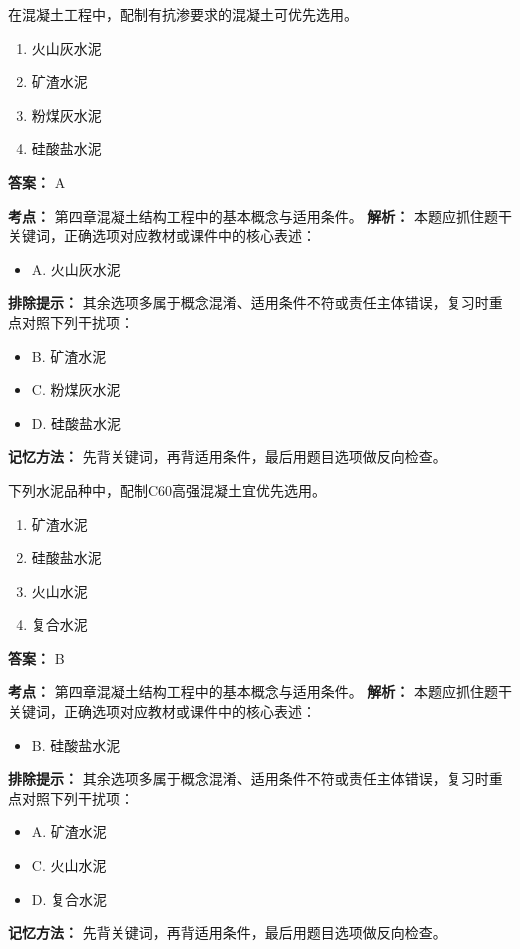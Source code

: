 \documentclass[UTF8,fontset=fandol,11pt]{ctexart}
\begin{document}
\vspace{0.2em}

\begin{quizbox}[title={第 50 题}]
在混凝土工程中，配制有抗渗要求的混凝土可优先选用。\\
\begin{enumerate}[label=\Alph*.]
\item 火山灰水泥
\item 矿渣水泥
\item 粉煤灰水泥
\item 硅酸盐水泥
\end{enumerate}
\textbf{答案：} A
\vspace{0.25em}
\begin{answerbox}[title={考点解析}]
\textbf{考点：} 第四章混凝土结构工程中的基本概念与适用条件。
\textbf{解析：} 本题应抓住题干关键词，正确选项对应教材或课件中的核心表述：
\begin{itemize}
\item A. 火山灰水泥
\end{itemize}
\textbf{排除提示：} 其余选项多属于概念混淆、适用条件不符或责任主体错误，复习时重点对照下列干扰项：
\begin{itemize}
\item B. 矿渣水泥
\item C. 粉煤灰水泥
\item D. 硅酸盐水泥
\end{itemize}
\textbf{记忆方法：} 先背关键词，再背适用条件，最后用题目选项做反向检查。
\end{answerbox}
\end{quizbox}

\vspace{0.2em}

\begin{quizbox}[title={第 51 题}]
下列水泥品种中，配制C60高强混凝土宜优先选用。\\
\begin{enumerate}[label=\Alph*.]
\item 矿渣水泥
\item 硅酸盐水泥
\item 火山水泥
\item 复合水泥
\end{enumerate}
\textbf{答案：} B
\vspace{0.25em}
\begin{answerbox}[title={考点解析}]
\textbf{考点：} 第四章混凝土结构工程中的基本概念与适用条件。
\textbf{解析：} 本题应抓住题干关键词，正确选项对应教材或课件中的核心表述：
\begin{itemize}
\item B. 硅酸盐水泥
\end{itemize}
\textbf{排除提示：} 其余选项多属于概念混淆、适用条件不符或责任主体错误，复习时重点对照下列干扰项：
\begin{itemize}
\item A. 矿渣水泥
\item C. 火山水泥
\item D. 复合水泥
\end{itemize}
\textbf{记忆方法：} 先背关键词，再背适用条件，最后用题目选项做反向检查。
\end{answerbox}
\end{quizbox}
\end{document}
